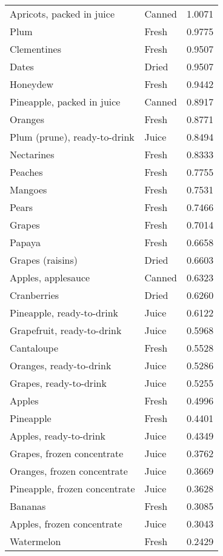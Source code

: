 \documentclass[
]{article}
\begin{document}
\begin{longtable}[t]{llr}
Apricots, packed in juice & Canned & 1.0071\\
Plum & Fresh & 0.9775\\
Clementines & Fresh & 0.9507\\
Dates & Dried & 0.9507\\
\addlinespace
Honeydew & Fresh & 0.9442\\
Pineapple, packed in juice & Canned & 0.8917\\
Oranges & Fresh & 0.8771\\
Plum (prune), ready-to-drink & Juice & 0.8494\\
Nectarines & Fresh & 0.8333\\
\addlinespace
Peaches & Fresh & 0.7755\\
Mangoes & Fresh & 0.7531\\
Pears & Fresh & 0.7466\\
Grapes & Fresh & 0.7014\\
Papaya & Fresh & 0.6658\\
\addlinespace
Grapes (raisins) & Dried & 0.6603\\
Apples, applesauce & Canned & 0.6323\\
Cranberries & Dried & 0.6260\\
Pineapple, ready-to-drink & Juice & 0.6122\\
Grapefruit, ready-to-drink & Juice & 0.5968\\
\addlinespace
Cantaloupe & Fresh & 0.5528\\
Oranges, ready-to-drink & Juice & 0.5286\\
Grapes, ready-to-drink & Juice & 0.5255\\
Apples & Fresh & 0.4996\\
Pineapple & Fresh & 0.4401\\
\addlinespace
Apples, ready-to-drink & Juice & 0.4349\\
Grapes, frozen concentrate & Juice & 0.3762\\
Oranges, frozen concentrate & Juice & 0.3669\\
Pineapple, frozen concentrate & Juice & 0.3628\\
Bananas & Fresh & 0.3085\\
\addlinespace
Apples, frozen concentrate & Juice & 0.3043\\
Watermelon & Fresh & 0.2429\\
\bottomrule
\end{longtable}
\end{document}
